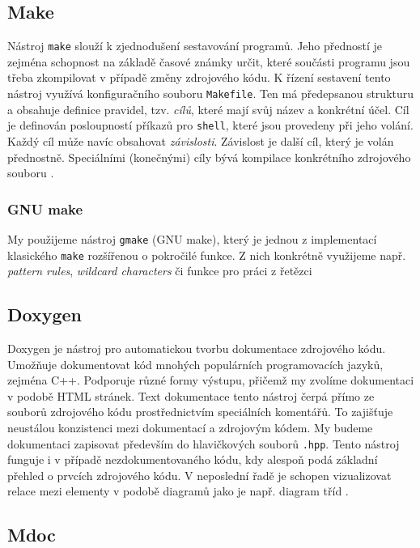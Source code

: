 \documentclass[thesis=B,czech,hidelinks]{thesis}[2012/06/26]
\begin{document}
\subsection{Make}

Nástroj \texttt{make} slouží k zjednodušení sestavování programů. Jeho předností je zejména schopnost na základě časové známky určit, které součásti programu jsou třeba zkompilovat v případě změny zdrojového kódu. K řízení sestavení tento nástroj využívá konfiguračního souboru \texttt{Makefile}. Ten má předepsanou strukturu a obsahuje definice pravidel, tzv. \emph{cílů}, které mají svůj název a konkrétní účel. Cíl je definován posloupností příkazů pro \texttt{shell}, které jsou provedeny při jeho volání. Každý cíl může navíc obsahovat \emph{závislosti}. Závislost je další cíl, který je volán přednostně. Speciálními (konečnými) cíly bývá kompilace konkrétního zdrojového souboru \cite{gmake}.

\subsubsection{GNU make}

My použijeme nástroj \texttt{gmake} (GNU make), který je jednou z implementací klasického \texttt{make} rozšířenou o pokročilé funkce. Z nich konkrétně využijeme např. \emph{pattern rules}, \emph{wildcard characters} či funkce pro práci z řetězci \cite{gmake}

\subsection{Doxygen}

Doxygen je nástroj pro automatickou tvorbu dokumentace zdrojového kódu. Umožňuje dokumentovat kód mnohých populárních programovacích jazyků, zejména C++. Podporuje různé formy výstupu, přičemž my zvolíme dokumentaci v podobě HTML stránek. Text dokumentace tento nástroj čerpá přímo ze souborů zdrojového kódu prostřednictvím speciálních komentářů. To zajišťuje neustálou konzistenci mezi dokumentací a zdrojovým kódem. My budeme dokumentaci zapisovat především do hlavičkových souborů \texttt{.hpp}. Tento nástroj funguje i v případě nezdokumentovaného kódu, kdy alespoň podá základní přehled o prvcích zdrojového kódu. V neposlední řadě je schopen vizualizovat relace mezi elementy v podobě diagramů jako je např. diagram tříd \cite{doxygen}.

\subsection{Mdoc}
\end{document}
